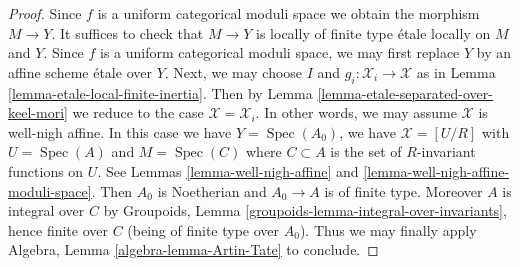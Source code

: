 \documentclass[10pt,a4paper]{amsart}
\theoremstyle{plain}
\theoremstyle{definition}
\theoremstyle{remark}
\numberwithin{equation}{subsection}
\def\Spec{\mathop{\mathrm{Spec}}}
\begin{document}
\begin{proof}
Since $f$ is a uniform categorical moduli space we obtain the
morphism $M \to Y$. It suffices to check that $M \to Y$
is locally of finite type \'etale locally on $M$ and $Y$.
Since $f$ is a uniform categorical moduli space, we
may first replace $Y$ by an affine scheme \'etale over $Y$.
Next, we may choose $I$ and $g_i : \mathcal{X}_i \to \mathcal{X}$
as in Lemma \ref{lemma-etale-local-finite-inertia}.
Then by Lemma \ref{lemma-etale-separated-over-keel-mori}
we reduce to the case $\mathcal{X} = \mathcal{X}_i$.
In other words, we may assume $\mathcal{X}$ is well-nigh affine.
In this case we have $Y = \Spec(A_0)$, we have
$\mathcal{X} = [U/R]$ with $U = \Spec(A)$ and
$M = \Spec(C)$ where $C \subset A$ is the set of $R$-invariant
functions on $U$. See
Lemmas \ref{lemma-well-nigh-affine} and
\ref{lemma-well-nigh-affine-moduli-space}.
Then $A_0$ is Noetherian and $A_0 \to A$ is of finite type.
Moreover $A$ is integral over $C$ by
Groupoids, Lemma \ref{groupoids-lemma-integral-over-invariants},
hence finite over $C$
(being of finite type over $A_0$).
Thus we may finally apply
Algebra, Lemma \ref{algebra-lemma-Artin-Tate}
to conclude.
\end{proof}
\end{document}
